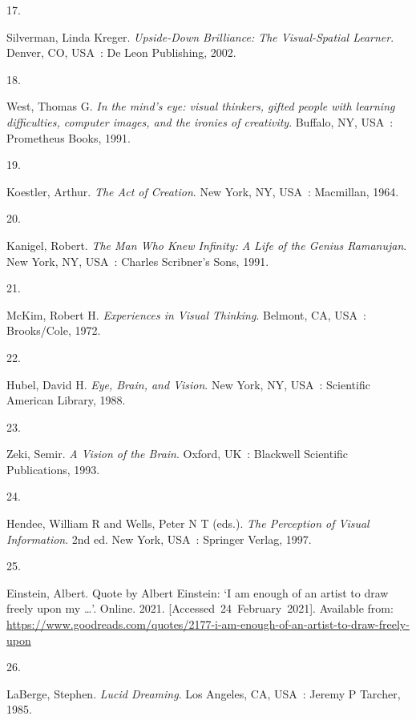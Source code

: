 \documentclass[
  a4paper,
]{article}
\newlength{\cslhangindent}
\newlength{\csllabelwidth}
\newlength{\cslentryspacingunit} %
\newenvironment{CSLReferences}[2] %
 {%
  \setlength{\parindent}{0pt}
  \ifodd #1
  \let\oldpar\par
  \def\par{\hangindent=\cslhangindent\oldpar}
  \fi
  \setlength{\parskip}{#2\cslentryspacingunit}
 }%
 {}
\newcommand{\CSLLeftMargin}[1]{\parbox[t]{\csllabelwidth}{#1}}
\newcommand{\CSLRightInline}[1]{\parbox[t]{\linewidth - \csllabelwidth}{#1}\break}
\begin{document}
\begin{CSLReferences}{0}{0}
\leavevmode{}%
\CSLLeftMargin{17. }%
\CSLRightInline{Silverman, Linda Kreger. \emph{{Upside-Down Brilliance:
The Visual-Spatial Learner}}. Denver, CO, USA~: De Leon Publishing,
2002. }

\leavevmode{}%
\CSLLeftMargin{18. }%
\CSLRightInline{West, Thomas G. \emph{{In the mind's eye: visual
thinkers, gifted people with learning difficulties, computer images, and
the ironies of creativity}}. Buffalo, NY, USA~: Prometheus Books, 1991.
}

\leavevmode{}%
\CSLLeftMargin{19. }%
\CSLRightInline{Koestler, Arthur. \emph{{The Act of Creation}}. New
York, NY, USA~: Macmillan, 1964. }

\leavevmode{}%
\CSLLeftMargin{20. }%
\CSLRightInline{Kanigel, Robert. \emph{{The Man Who Knew Infinity: A
Life of the Genius Ramanujan}}. New York, NY, USA~: Charles Scribner's
Sons, 1991. }

\leavevmode{}%
\CSLLeftMargin{21. }%
\CSLRightInline{McKim, Robert H. \emph{{Experiences in Visual
Thinking}}. Belmont, CA, USA~: Brooks/Cole, 1972. }

\leavevmode{}%
\CSLLeftMargin{22. }%
\CSLRightInline{Hubel, David H. \emph{{Eye, Brain, and Vision}}. New
York, NY, USA~: Scientific American Library, 1988. }

\leavevmode{}%
\CSLLeftMargin{23. }%
\CSLRightInline{Zeki, Semir. \emph{{A Vision of the Brain}}. Oxford,
UK~: Blackwell Scientific Publications, 1993. }

\leavevmode{}%
\CSLLeftMargin{24. }%
\CSLRightInline{Hendee, William R and Wells, Peter N T (eds.).
\emph{{The Perception of Visual Information}}. 2nd ed. New York, USA~:
Springer Verlag, 1997. }

\leavevmode{}%
\CSLLeftMargin{25. }%
\CSLRightInline{Einstein, Albert. {Quote by Albert Einstein: {`I am
enough of an artist to draw freely upon my \ldots{}'}}. Online. 2021.
{[}Accessed~24~February~2021{]}. Available from:
\url{https://www.goodreads.com/quotes/2177-i-am-enough-of-an-artist-to-draw-freely-upon}}

\leavevmode{}%
\CSLLeftMargin{26. }%
\CSLRightInline{LaBerge, Stephen. \emph{{Lucid Dreaming}}. Los Angeles,
CA, USA~: Jeremy P Tarcher, 1985. }


\end{CSLReferences}
\end{document}
